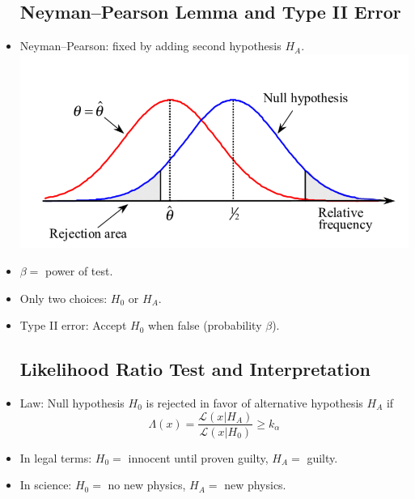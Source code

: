 \begin{itemize}
          \subsection{Neyman–Pearson Lemma and Type II Error}
    \item Neyman–Pearson: fixed by adding second hypothesis $H_A$.
          \includegraphics[width = 0.5\linewidth]{Images/lec14-neyman-pearson-test.png}
    \item $\beta =$ power of test.
    \item Only two choices: $H_0$ or $H_A$.
    \item Type II error: Accept $H_0$ when false (probability $\beta$).

          \subsection{Likelihood Ratio Test and Interpretation}
    \item Law: Null hypothesis $H_0$ is rejected in favor of alternative hypothesis $H_A$ if
          \[
              \Lambda(x) = \frac{\mathcal{L}(x|H_A)}{\mathcal{L}(x|H_0)} \ge k_{\alpha}
          \]
    \item In legal terms: $H_0 =$ innocent until proven guilty, $H_A =$ guilty.
    \item In science: $H_0 =$ no new physics, $H_A =$ new physics.

\end{itemize}
